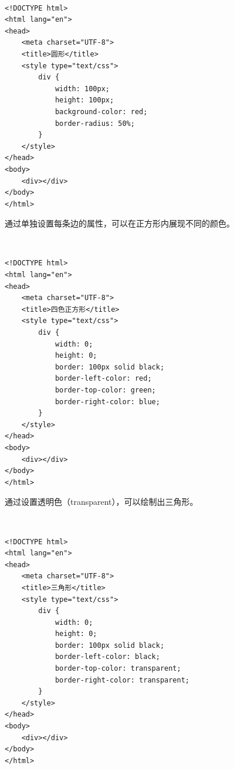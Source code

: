  \\
\begin{lstlisting}[style=htmlcssjs]
<!DOCTYPE html>
<html lang="en">
<head>
    <meta charset="UTF-8">
    <title>圆形</title>
    <style type="text/css">
        div {
            width: 100px;
            height: 100px;
            background-color: red;
            border-radius: 50%;
        }
    </style>
</head>
<body>
    <div></div>
</body>
</html>
\end{lstlisting}

通过单独设置每条边的属性，可以在正方形内展现不同的颜色。

\begin{figure}[H]
    \centering
\end{figure}

 \\
\begin{lstlisting}[style=htmlcssjs]
<!DOCTYPE html>
<html lang="en">
<head>
    <meta charset="UTF-8">
    <title>四色正方形</title>
    <style type="text/css">
        div {
            width: 0;
            height: 0;
            border: 100px solid black;
            border-left-color: red;
            border-top-color: green;
            border-right-color: blue;
        }
    </style>
</head>
<body>
    <div></div>
</body>
</html>
\end{lstlisting}

通过设置透明色（transparent），可以绘制出三角形。

\begin{figure}[H]
    \centering
\end{figure}

 \\
\begin{lstlisting}[style=htmlcssjs]
<!DOCTYPE html>
<html lang="en">
<head>
    <meta charset="UTF-8">
    <title>三角形</title>
    <style type="text/css">
        div {
            width: 0;
            height: 0;
            border: 100px solid black;
            border-left-color: black;
            border-top-color: transparent;
            border-right-color: transparent;
        }
    </style>
</head>
<body>
    <div></div>
</body>
</html>
\end{lstlisting}

